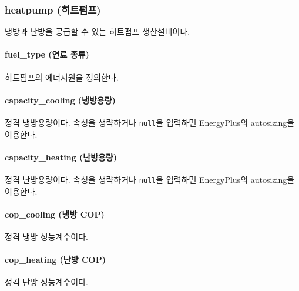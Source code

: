 \subsubsection{heatpump (히트펌프)} \label{subsubsection:ioref:heatpump}

냉방과 난방을 공급할 수 있는 히트펌프 생산설비이다.


\paragraph{fuel\_type (연료 종류)} 히트펌프의 에너지원을 정의한다.

\paragraph{capacity\_cooling (냉방용량)} 정격 냉방용량이다. 속성을 생략하거나 \texttt{null}을 입력하면 EnergyPlus의 autosizing을 이용한다.

\paragraph{capacity\_heating (난방용량)} 정격 난방용량이다. 속성을 생략하거나 \texttt{null}을 입력하면 EnergyPlus의 autosizing을 이용한다.

\paragraph{cop\_cooling (냉방 COP)} 정격 냉방 성능계수이다.

\paragraph{cop\_heating (난방 COP)} 정격 난방 성능계수이다.


